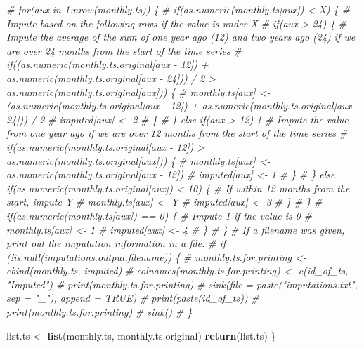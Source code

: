 \documentclass[
]{article}
\newenvironment{Shaded}{\begin{snugshade}}{\end{snugshade}}
\newcommand{\CommentTok}[1]{\textcolor[rgb]{0.56,0.35,0.01}{\textit{#1}}}
\newcommand{\FunctionTok}[1]{\textcolor[rgb]{0.13,0.29,0.53}{\textbf{#1}}}
\newcommand{\NormalTok}[1]{#1}
\newcommand{\OtherTok}[1]{\textcolor[rgb]{0.56,0.35,0.01}{#1}}
\begin{document}
\begin{Shaded}
\begin{Highlighting}[]
  \CommentTok{\# for(aux in 1:nrow(monthly.ts)) \{}
  \CommentTok{\#   if(as.numeric(monthly.ts[aux]) \textless{} X) \{ \# Impute based on the following rows if the value is under X}
  \CommentTok{\#     if(aux \textgreater{} 24) \{ \# Impute the average of the sum of one year ago (12) and two years ago (24) if we are over 24 months from the start of the time series}
  \CommentTok{\#       if((as.numeric(monthly.ts.original[aux {-} 12]) + as.numeric(monthly.ts.original[aux {-} 24])) / 2 \textgreater{} as.numeric(monthly.ts.original[aux])) \{}
  \CommentTok{\#         monthly.ts[aux] \textless{}{-} (as.numeric(monthly.ts.original[aux {-} 12]) + as.numeric(monthly.ts.original[aux {-} 24])) / 2}
  \CommentTok{\#         imputed[aux] \textless{}{-} 2}
  \CommentTok{\#       \}}
  \CommentTok{\#     \} else if(aux \textgreater{} 12) \{ \# Impute the value from one year ago if we are over 12 months from the start of the time series}
  \CommentTok{\#       if(as.numeric(monthly.ts.original[aux {-} 12]) \textgreater{} as.numeric(monthly.ts.original[aux])) \{}
  \CommentTok{\#         monthly.ts[aux] \textless{}{-} as.numeric(monthly.ts.original[aux {-} 12])}
  \CommentTok{\#         imputed[aux] \textless{}{-} 1}
  \CommentTok{\#       \}}
  \CommentTok{\#     \} else if(as.numeric(monthly.ts.original[aux]) \textless{} 10) \{ \# If within 12 months from the start, impute Y}
  \CommentTok{\#       monthly.ts[aux] \textless{}{-} Y}
  \CommentTok{\#       imputed[aux] \textless{}{-} 3}
  \CommentTok{\#     \}}
  \CommentTok{\#   \}}
  \CommentTok{\#   if(as.numeric(monthly.ts[aux]) == 0) \{ \# Impute 1 if the value is 0}
  \CommentTok{\#       monthly.ts[aux] \textless{}{-} 1}
  \CommentTok{\#       imputed[aux] \textless{}{-} 4}
  \CommentTok{\#   \}}
  \CommentTok{\# \}}
  \CommentTok{\# If a filename was given, print out the imputation information in a file. }
  \CommentTok{\# if (!is.null(imputations.output.filename)) \{}
  \CommentTok{\#   monthly.ts.for.printing \textless{}{-} cbind(monthly.ts, imputed)}
  \CommentTok{\#   colnames(monthly.ts.for.printing) \textless{}{-}  c(id\_of\_ts, "Imputed")}
  \CommentTok{\#   print(monthly.ts.for.printing)}
  \CommentTok{\#   sink(file = paste("imputations.txt", sep = "\_"), append = TRUE)}
  \CommentTok{\#   print(paste(id\_of\_ts))}
  \CommentTok{\#   print(monthly.ts.for.printing)}
  \CommentTok{\#   sink()}
  \CommentTok{\# \}}
  
\NormalTok{  list.ts }\OtherTok{\textless{}{-}} \FunctionTok{list}\NormalTok{(monthly.ts, monthly.ts.original)}
  \FunctionTok{return}\NormalTok{(list.ts)}
\NormalTok{\}}


\end{Highlighting}
\end{Shaded}
\end{document}
